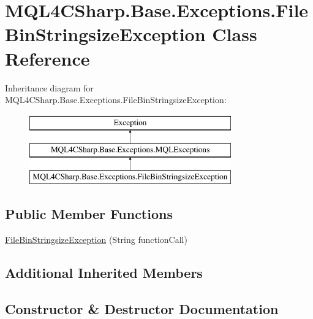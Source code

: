 \hypertarget{class_m_q_l4_c_sharp_1_1_base_1_1_exceptions_1_1_file_bin_stringsize_exception}{}\section{M\+Q\+L4\+C\+Sharp.\+Base.\+Exceptions.\+File\+Bin\+Stringsize\+Exception Class Reference}
\label{class_m_q_l4_c_sharp_1_1_base_1_1_exceptions_1_1_file_bin_stringsize_exception}
Inheritance diagram for M\+Q\+L4\+C\+Sharp.\+Base.\+Exceptions.\+File\+Bin\+Stringsize\+Exception\+:\begin{figure}[H]
\begin{center}
\leavevmode
\includegraphics[height=3.000000cm]{class_m_q_l4_c_sharp_1_1_base_1_1_exceptions_1_1_file_bin_stringsize_exception}
\end{center}
\end{figure}
\subsection*{Public Member Functions}
\begin{DoxyCompactItemize}
\item 
\hyperlink{class_m_q_l4_c_sharp_1_1_base_1_1_exceptions_1_1_file_bin_stringsize_exception_a3906705a84126bca518ad218c3525c18}{File\+Bin\+Stringsize\+Exception} (String function\+Call)
\end{DoxyCompactItemize}
\subsection*{Additional Inherited Members}


\subsection{Constructor \& Destructor Documentation}
